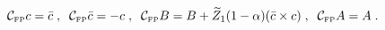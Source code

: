 \begin{equation}
  \label{eq:CFP}
    \mathcal{C}_{\mbox{\tiny FP}} c = \bar c \; , \;\;
    \mathcal{C}_{\mbox{\tiny FP}} \bar c =  - c \; , \;\;
    \mathcal{C}_{\mbox{\tiny FP}} B = B + \widetilde Z_1  (1-\alpha )
    (\bar c \times c)  \; , \;\;  \mathcal{C}_{\mbox{\tiny FP}} A = A \;.
\end{equation}

